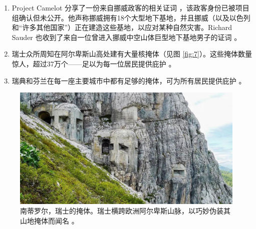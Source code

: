 \documentclass[10pt,twocolumn,letterpaper]{article}
\begin{document}
\begin{flushleft}
\begin{enumerate}
    \item Project Camelot 分享了一份来自挪威政客的相关证词 \cite{25,26}，该政客身份已被项目组确认但未公开。他声称挪威拥有18个大型地下基地，并且挪威（以及以色列和“许多其他国家”）正在建造这些基地，以应对某种自然灾害。Richard Sauder 也收到了来自一位曾进入挪威中空山体巨型地下基地男子的证词 \cite{22}。
    \item 瑞士众所周知在阿尔卑斯山高处建有大量核掩体（见图 \ref{fig:7}）。这些掩体数量惊人，超过37万个——足以为每一位居民提供庇护 \cite{27}。
    \item 瑞典和芬兰在每一座主要城市中都有足够的掩体，可为所有居民提供庇护 \cite{27}。
\end{enumerate}
\end{flushleft}

\begin{figure}[t]
\begin{center}
   \includegraphics[width=1\linewidth]{tyrol.jpg}
\end{center}
\caption{南蒂罗尔，瑞士的掩体。瑞士横跨欧洲阿尔卑斯山脉，以巧妙伪装其山地掩体而闻名 \cite{32}。}
\label{fig:7}
\label{fig:onecol}
\end{figure}
\end{document}
